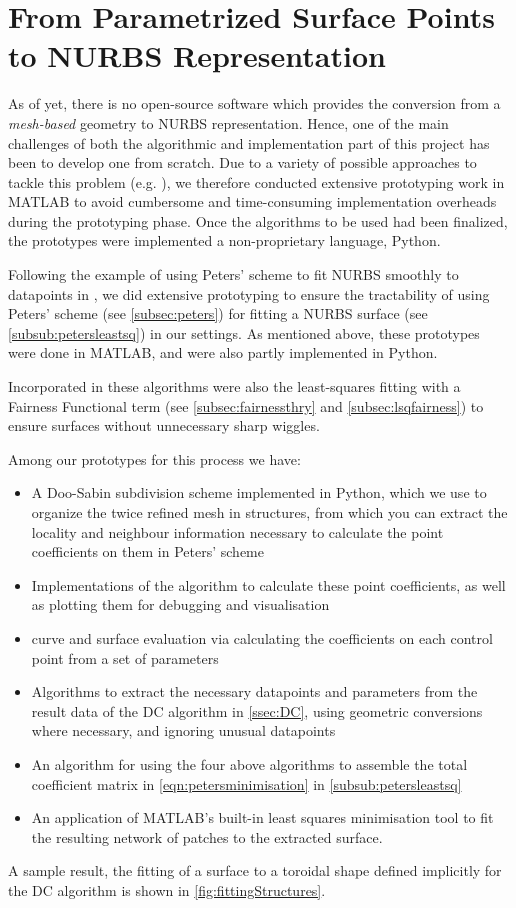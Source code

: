 \section{From Parametrized Surface Points to NURBS Representation}
As of yet, there is no open-source software which provides the conversion from a \textit{mesh-based} geometry to NURBS representation. Hence, one of the main challenges of both the algorithmic and implementation part of this project has been to develop one from scratch. Due to a variety of possible approaches to tackle this problem (e.g. \cite{ eck1996automatic, becker2011advanced}), we therefore conducted extensive prototyping work in MATLAB \cite{MATLAB} to avoid cumbersome and time-consuming implementation overheads during the prototyping phase. Once the algorithms to be used had been finalized, the prototypes were implemented a non-proprietary language, Python.

Following the example of using Peters' scheme to fit NURBS smoothly to datapoints in \cite{eck1996automatic}, we did extensive prototyping to ensure the tractability of using Peters' scheme (see \autoref{subsec:peters}) for fitting a NURBS surface (see \autoref{subsub:petersleastsq}) in our settings. As mentioned above, these prototypes were done in MATLAB, and were also partly implemented in Python. 

Incorporated in these algorithms were also the least-squares fitting with a Fairness Functional term (see \autoref{subsec:fairnessthry} and \autoref{subsec:lsqfairness}) to ensure surfaces without unnecessary sharp wiggles.

Among our prototypes for this process we have:
\begin{itemize}
\item A Doo-Sabin subdivision scheme implemented in Python, which we use to organize the twice refined mesh in structures, from which you can extract the locality and neighbour information necessary to calculate the \Bez point coefficients on them in Peters' scheme
\item Implementations of the algorithm to calculate these \Bez point coefficients, as well as plotting them for debugging and visualisation
\item \Bez curve and surface evaluation via calculating the coefficients on each \Bez control point from a set of parameters
\item Algorithms to extract the necessary datapoints and parameters from the result data of the \acf{DC} algorithm in \autoref{ssec:DC}, using geometric conversions where necessary, and ignoring unusual datapoints
\item An algorithm for using the four above algorithms to assemble the total coefficient matrix in \autoref{eqn:petersminimisation} in \autoref{subsub:petersleastsq}
\item An application of MATLAB's built-in least squares minimisation tool to fit the resulting network of \Bez patches to the extracted surface.
\end{itemize}
A sample result, the fitting of a surface to a toroidal shape defined implicitly for the \acs{DC} algorithm is shown in \autoref{fig:fittingStructures}.


